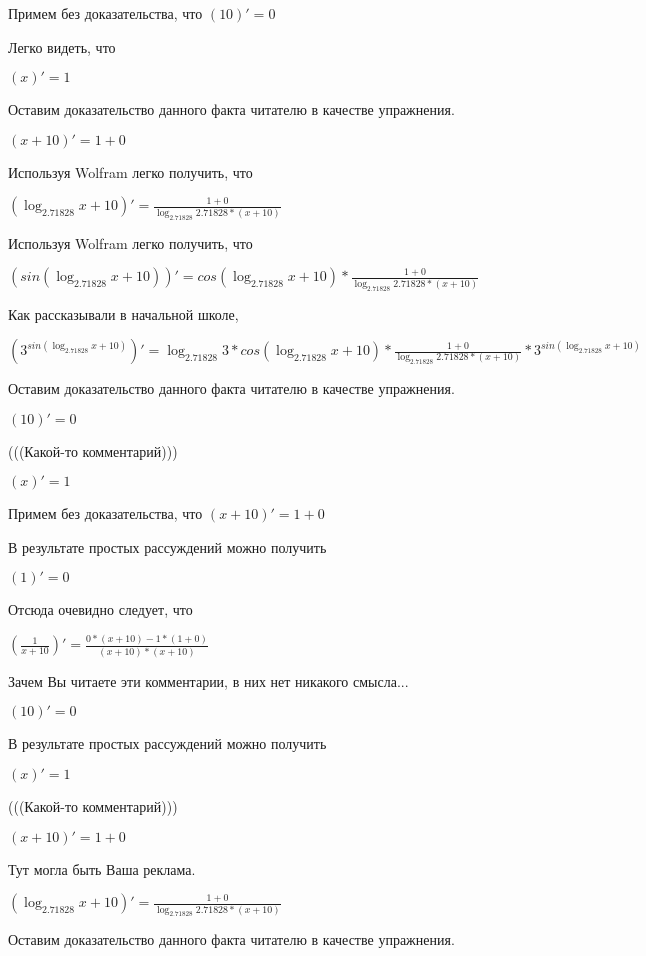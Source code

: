 \documentclass[12pt,a4paper,fleqn]{article}
\theoremstyle{definition}
\begin{document}
Примем без доказательства, что
$( 10 )' =  0 $

Легко видеть, что

$( x )' =  1 $

Оставим доказательство данного факта читателю в качестве упражнения.

$( x  +  10 )' =  1  +  0 $

Используя Wolfram легко получить, что

$(\log_{ 2.71828 }{ x  +  10 })' = \frac{ 1  +  0 }{\log_{ 2.71828 }{ 2.71828 } * ( x  +  10 )}
$

Используя Wolfram легко получить, что

$(sin(\log_{ 2.71828 }{ x  +  10 }))' = cos(\log_{ 2.71828 }{ x  +  10 }) * \frac{ 1  +  0 }{\log_{ 2.71828 }{ 2.71828 } * ( x  +  10 )}
$

Как рассказывали в начальной школе,

$({ 3 }^{sin(\log_{ 2.71828 }{ x  +  10 })})' = \log_{ 2.71828 }{ 3 } * cos(\log_{ 2.71828 }{ x  +  10 }) * \frac{ 1  +  0 }{\log_{ 2.71828 }{ 2.71828 } * ( x  +  10 )}
 * { 3 }^{sin(\log_{ 2.71828 }{ x  +  10 })}$

Оставим доказательство данного факта читателю в качестве упражнения.

$( 10 )' =  0 $

(((Какой-то комментарий)))

$( x )' =  1 $

Примем без доказательства, что
$( x  +  10 )' =  1  +  0 $

В результате простых рассуждений можно получить

$( 1 )' =  0 $

Отсюда очевидно следует, что

$(\frac{ 1 }{ x  +  10 }
)' = \frac{ 0  * ( x  +  10 ) -  1  * ( 1  +  0 )}{( x  +  10 ) * ( x  +  10 )}
$

Зачем Вы читаете эти комментарии, в них нет никакого смысла...

$( 10 )' =  0 $

В результате простых рассуждений можно получить

$( x )' =  1 $

(((Какой-то комментарий)))

$( x  +  10 )' =  1  +  0 $

Тут могла быть Ваша реклама.

$(\log_{ 2.71828 }{ x  +  10 })' = \frac{ 1  +  0 }{\log_{ 2.71828 }{ 2.71828 } * ( x  +  10 )}
$

Оставим доказательство данного факта читателю в качестве упражнения.
\end{document}
